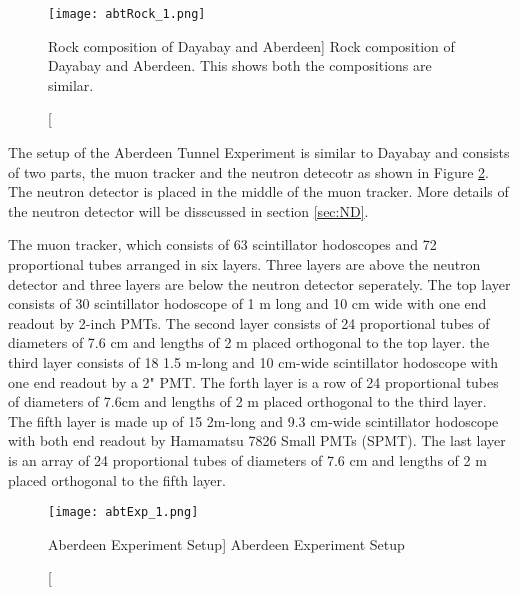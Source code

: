 \begin{figure}
    \centering
    \texttt{[image: abtRock\_1.png]}
    \caption
    [Rock composition of Dayabay and Aberdeen]
    {Rock composition of Dayabay and Aberdeen. This shows both the compositions are similar.}
    \label{fig:abtRock.png}
    \end{figure}


The setup of the Aberdeen Tunnel Experiment is similar to Dayabay and consists of
two parts, the muon tracker and the neutron detecotr as shown in Figure
\ref{fig:abtExp}.
The neutron detector is placed in the
middle of the muon tracker.
More details of the neutron detector will be disscussed in section \ref{sec:ND}.

The muon tracker, which consists of 63 scintillator hodoscopes and 72 proportional
tubes arranged in six layers.
Three layers are above the neutron detector and three layers are below the neutron detector seperately.
The top layer consists of 30 scintillator hodoscope of 1 m long and 10 cm wide with
one end readout by 2-inch PMTs. The second layer consists of 24 proportional tubes of diameters of
7.6 cm and lengths of 2 m placed orthogonal to the top layer. the third layer consists of 18 1.5 m-long
and 10 cm-wide scintillator hodoscope with one end readout by a 2" PMT. The forth layer is a row
of 24 proportional tubes of diameters of 7.6cm and lengths of 2 m placed orthogonal to the third layer.
The fifth layer is made up of 15 2m-long and 9.3 cm-wide scintillator hodoscope with both end
readout by Hamamatsu 7826 Small PMTs (SPMT). The last layer is an array of 24 proportional tubes
of diameters of 7.6 cm and lengths of 2 m placed  orthogonal to the fifth layer.




\begin{figure}
    \centering
    \texttt{[image: abtExp\_1.png]}
    \caption
    [Aberdeen Experiment Setup]
    {Aberdeen Experiment Setup}
    \label{fig:abtExp}
    \end{figure}







